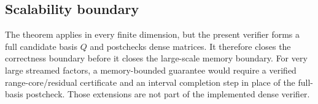\subsection{Scalability boundary}

The theorem applies in every finite dimension, but the present verifier forms a full candidate
basis \(Q\) and postchecks dense matrices.  It therefore closes the correctness
boundary before it closes the large-scale memory boundary.  For very large streamed factors, a memory-bounded guarantee would require a
verified range-core/residual certificate and an interval completion step in
place of the full-basis postcheck. Those extensions are not part of the
implemented dense verifier.



